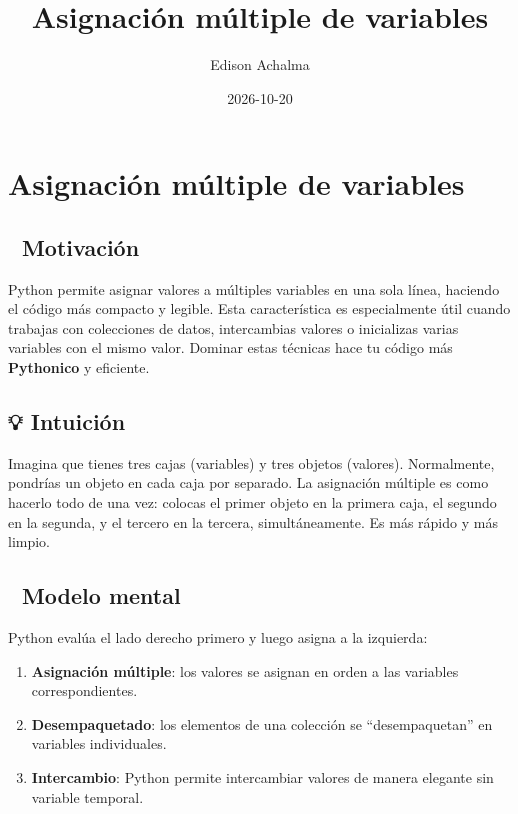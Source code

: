 \documentclass[
  doc,
  floatsintext,
  longtable,
  a4paper,
  nolmodern,
  notxfonts,
  notimes,
  12pt,
  colorlinks=true,linkcolor=blue,citecolor=blue,urlcolor=blue]{apa7}
\title{Asignación múltiple de variables}
\author{Edison Achalma}
\affiliation{
{Escuela Profesional de Economía, Universidad Nacional de San Cristóbal
de Huamanga}}
\date{2026-10-20}
\providecommand{\tightlist}{%
  \setlength{\itemsep}{0pt}\setlength{\parskip}{0pt}}
\begin{document}
\maketitle


\hypertarget{toc}{}
\tableofcontents
\newpage
\section[Introduction]{Asignación múltiple de variables}

\setcounter{secnumdepth}{3}

\setlength\LTleft{0pt}




\subsection{🎯 Motivación}\label{motivaciuxf3n}

Python permite asignar valores a múltiples variables en una sola línea,
haciendo el código más compacto y legible. Esta característica es
especialmente útil cuando trabajas con colecciones de datos,
intercambias valores o inicializas varias variables con el mismo valor.
Dominar estas técnicas hace tu código más \textbf{Pythonico} y
eficiente.

\subsection{💡 Intuición}\label{intuiciuxf3n}

Imagina que tienes tres cajas (variables) y tres objetos (valores).
Normalmente, pondrías un objeto en cada caja por separado. La asignación
múltiple es como hacerlo todo de una vez: colocas el primer objeto en la
primera caja, el segundo en la segunda, y el tercero en la tercera,
simultáneamente. Es más rápido y más limpio.

\subsection{🧠 Modelo mental}\label{modelo-mental}

Python evalúa el lado derecho primero y luego asigna a la izquierda:

\begin{enumerate}
\def\labelenumi{\arabic{enumi}.}
\tightlist
\item
  \textbf{Asignación múltiple}: los valores se asignan en orden a las
  variables correspondientes.
\item
  \textbf{Desempaquetado}: los elementos de una colección se
  ``desempaquetan'' en variables individuales.
\item
  \textbf{Intercambio}: Python permite intercambiar valores de manera
  elegante sin variable temporal.
\end{enumerate}
\end{document}
